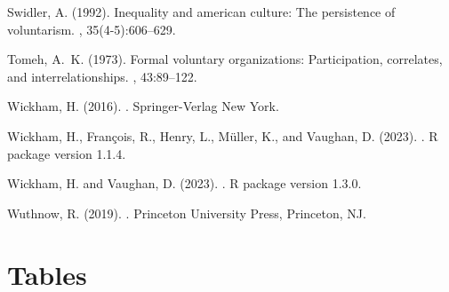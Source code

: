 \documentclass[12pt,letterpaper]{article}
\begin{document}
\begin{thebibliography}{}
Swidler, A. (1992).
\newblock Inequality and american culture: The persistence of voluntarism.
, 35(4-5):606--629.

Tomeh, A.~K. (1973).
\newblock Formal voluntary organizations: Participation, correlates, and
  interrelationships.
, 43:89--122.

Wickham, H. (2016).
.
\newblock Springer-Verlag New York.

Wickham, H., Fran{\c c}ois, R., Henry, L., M{\"u}ller, K., and Vaughan, D.
  (2023).
.
\newblock R package version 1.1.4.

Wickham, H. and Vaughan, D. (2023).
.
\newblock R package version 1.3.0.

Wuthnow, R. (2019).
.
\newblock Princeton University Press, Princeton, NJ.

\end{thebibliography}
 

\clearpage
\section*{Tables}
\end{document}
